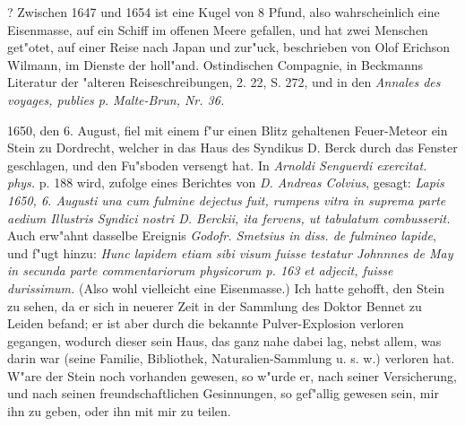 \documentclass[a4paper, 11pt, oneside, polutonikogreek, german]{article}
\begin{document}
? Zwischen 1647 und 1654 ist eine Kugel von 8 Pfund, also wahrscheinlich eine Eisenmasse, auf ein Schiff im offenen Meere gefallen, und hat zwei Menschen get"otet, auf einer Reise nach Japan und zur"uck, beschrieben von Olof Erichson Wilmann, im Dienste der holl"and. Ostindischen Compagnie, in Beckmanns Literatur der "alteren Reiseschreibungen, 2. 22, S. 272, und in den \emph{Annales des voyages, publies p. Malte-Brun, Nr. 36.}

1650, den 6. August, fiel mit einem f"ur einen Blitz gehaltenen Feuer-Meteor ein Stein zu Dordrecht, welcher in das Haus des Syndikus D. Berck durch das Fenster geschlagen, und den Fu"sboden versengt hat. In \emph{Arnoldi Senguerdi exercitat. phys.} p. 188 wird, zufolge eines Berichtes von \emph{D. Andreas Colvius}, gesagt: \emph{Lapis 1650, 6. Augusti una cum fulmine dejectus fuit, rumpens vitra in suprema parte aedium Illustris Syndici nostri D. Berckii, ita fervens, ut tabulatum combusserit.} Auch erw"ahnt dasselbe Ereignis \emph{Godofr. Smetsius in diss. de fulmineo lapide}, und f"ugt hinzu: \emph{Hunc lapidem etiam sibi visum fuisse testatur Johnnnes de May in secunda parte commentariorum physicorum p. 163 et adjecit, fuisse durissimum.} (Also wohl vielleicht eine Eisenmasse.) Ich hatte gehofft, den Stein zu sehen, da er sich in neuerer Zeit in der Sammlung des Doktor Bennet zu Leiden befand; er ist aber durch die bekannte Pulver-Explosion verloren gegangen, wodurch dieser sein Haus, das ganz nahe dabei lag, nebst allem, was darin war (seine Familie, Bibliothek, Naturalien-Sammlung u. s. w.) verloren hat. W"are der Stein noch vorhanden gewesen, so w"urde er, nach seiner Versicherung, und nach seinen freundschaftlichen Gesinnungen, so gef"allig gewesen sein, mir ihn zu geben, oder ihn mit mir zu teilen.
\end{document}
